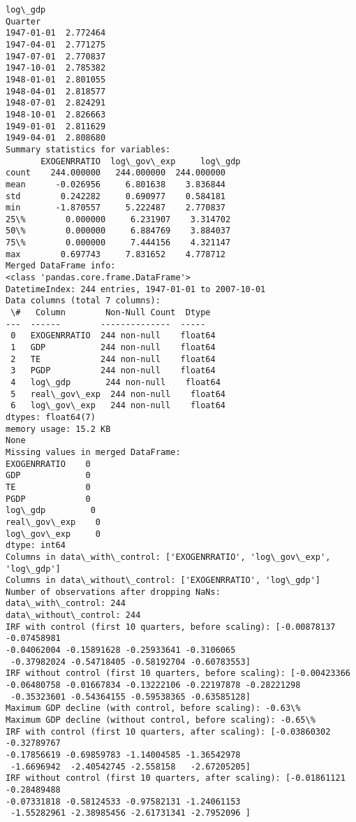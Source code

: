 \documentclass[11pt]{article}
\begin{document}
\begin{Verbatim}[commandchars=\\\{\}]
             log\_gdp
Quarter
1947-01-01  2.772464
1947-04-01  2.771275
1947-07-01  2.770837
1947-10-01  2.785382
1948-01-01  2.801055
1948-04-01  2.818577
1948-07-01  2.824291
1948-10-01  2.826663
1949-01-01  2.811629
1949-04-01  2.808680
Summary statistics for variables:
       EXOGENRRATIO  log\_gov\_exp     log\_gdp
count    244.000000   244.000000  244.000000
mean      -0.026956     6.801638    3.836844
std        0.242282     0.690977    0.584181
min       -1.870557     5.222487    2.770837
25\%        0.000000     6.231907    3.314702
50\%        0.000000     6.884769    3.884037
75\%        0.000000     7.444156    4.321147
max        0.697743     7.831652    4.778712
Merged DataFrame info:
<class 'pandas.core.frame.DataFrame'>
DatetimeIndex: 244 entries, 1947-01-01 to 2007-10-01
Data columns (total 7 columns):
 \#   Column        Non-Null Count  Dtype
---  ------        --------------  -----
 0   EXOGENRRATIO  244 non-null    float64
 1   GDP           244 non-null    float64
 2   TE            244 non-null    float64
 3   PGDP          244 non-null    float64
 4   log\_gdp       244 non-null    float64
 5   real\_gov\_exp  244 non-null    float64
 6   log\_gov\_exp   244 non-null    float64
dtypes: float64(7)
memory usage: 15.2 KB
None
Missing values in merged DataFrame:
EXOGENRRATIO    0
GDP             0
TE              0
PGDP            0
log\_gdp         0
real\_gov\_exp    0
log\_gov\_exp     0
dtype: int64
Columns in data\_with\_control: ['EXOGENRRATIO', 'log\_gov\_exp', 'log\_gdp']
Columns in data\_without\_control: ['EXOGENRRATIO', 'log\_gdp']
Number of observations after dropping NaNs:
data\_with\_control: 244
data\_without\_control: 244
IRF with control (first 10 quarters, before scaling): [-0.00878137 -0.07458981
-0.04062004 -0.15891628 -0.25933641 -0.3106065
 -0.37982024 -0.54718405 -0.58192704 -0.60783553]
IRF without control (first 10 quarters, before scaling): [-0.00423366
-0.06480758 -0.01667834 -0.13222106 -0.22197878 -0.28221298
 -0.35323601 -0.54364155 -0.59538365 -0.63585128]
Maximum GDP decline (with control, before scaling): -0.63\%
Maximum GDP decline (without control, before scaling): -0.65\%
IRF with control (first 10 quarters, after scaling): [-0.03860302 -0.32789767
-0.17856619 -0.69859783 -1.14004585 -1.36542978
 -1.6696942  -2.40542745 -2.558158   -2.67205205]
IRF without control (first 10 quarters, after scaling): [-0.01861121 -0.28489488
-0.07331818 -0.58124533 -0.97582131 -1.24061153
 -1.55282961 -2.38985456 -2.61731341 -2.7952096 ]
    \end{Verbatim}
\end{document}
